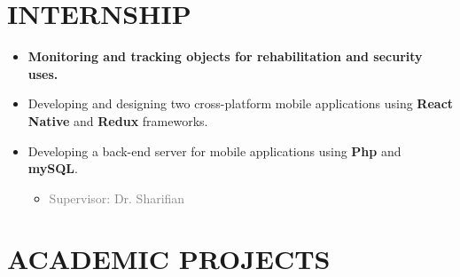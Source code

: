 \documentclass[10pt,a4paper,sans]{moderncv} %
\begin{document}
\section{INTERNSHIP}
\begin{itemize}
	\item \textbf{Monitoring and tracking objects for rehabilitation and security uses.}
	\item Developing and designing two cross-platform mobile applications using \textbf{React Native} and \textbf{Redux} frameworks.
	\item Developing a back-end server for mobile applications using \textbf{Php} and \textbf{mySQL}.
	\begin{itemize} 
		\item\textcolor{gray}{Supervisor: Dr. Sharifian} 
	\end{itemize}
\end{itemize}

\vspace{3em}

\section{ACADEMIC PROJECTS}
\end{document}
